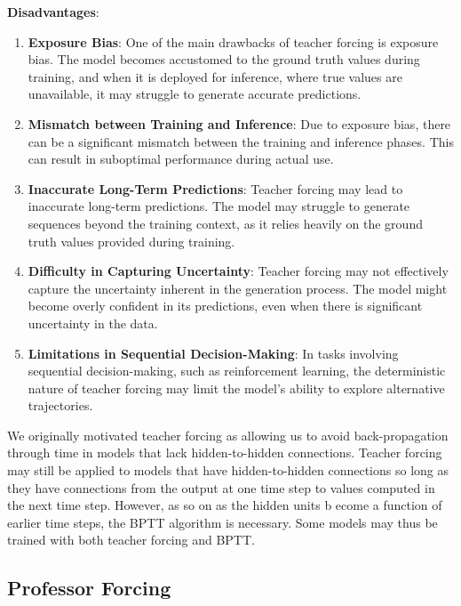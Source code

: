 \documentclass{report}
\begin{document}
\textbf{Disadvantages}:
\begin{enumerate}
\item \textbf{Exposure Bias}: One of the main drawbacks of teacher forcing is exposure bias. The model becomes accustomed to the ground truth values during training, and when it is deployed for inference, where true values are unavailable, it may struggle to generate accurate predictions.

\item \textbf{Mismatch between Training and Inference}: Due to exposure bias, there can be a significant mismatch between the training and inference phases. This can result in suboptimal performance during actual use.

\item \textbf{Inaccurate Long-Term Predictions}: Teacher forcing may lead to inaccurate long-term predictions. The model may struggle to generate sequences beyond the training context, as it relies heavily on the ground truth values provided during training.

\item \textbf{Difficulty in Capturing Uncertainty}: Teacher forcing may not effectively capture the uncertainty inherent in the generation process. The model might become overly confident in its predictions, even when there is significant uncertainty in the data.

\item \textbf{Limitations in Sequential Decision-Making}: In tasks involving sequential decision-making, such as reinforcement learning, the deterministic nature of teacher forcing may limit the model's ability to explore alternative trajectories.
\end{enumerate}

We originally motivated teacher forcing as allowing us to avoid back-propagation through time in models that lack hidden-to-hidden connections. Teacher forcing may still be applied to models that have hidden-to-hidden connections so long as they have connections from the output at one time step to values computed in the next time step. However, as so on as the hidden units b ecome a function of earlier time steps, the BPTT algorithm is necessary. Some models may thus be trained with both teacher forcing and BPTT.

\subsection{Professor Forcing}
\end{document}
